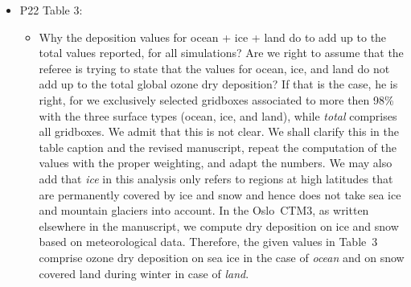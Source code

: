 \documentclass{scrartcl}
\begin{document}
\begin{itemize}
\item {\color{blue}  P22 Table 3:}
  \begin{itemize}
  \item {\color{blue}  Why the deposition values for ocean + ice + land do to add up to the total
    values reported, for all simulations?}
    Are we right to assume that the referee is trying to state that the values for ocean, ice, and land do
    not add up to the total global ozone dry deposition? If that is the case, he is right, for we exclusively
    selected gridboxes associated to more then 98\% with the three surface types (ocean, ice, and land), while
    \emph{total} comprises all gridboxes. We admit that this is not clear.
    We shall clarify this in the table caption and the revised manuscript, repeat the computation of the values
    with the proper weighting, and adapt the numbers.
    We may also add that \emph{ice} in this analysis only
    refers to regions at high latitudes that are permanently covered by ice and snow and hence does not take
    sea ice and mountain glaciers into account. In the Oslo~CTM3, as written elsewhere in the manuscript, we
    compute dry deposition on ice and snow based on meteorological data. Therefore, the given values in Table~3
    comprise ozone dry deposition on sea ice in the case of \emph{ocean} and on snow covered land during winter
    in case of \emph{land}.
   

\end{itemize}
\end{itemize}
\end{document}
